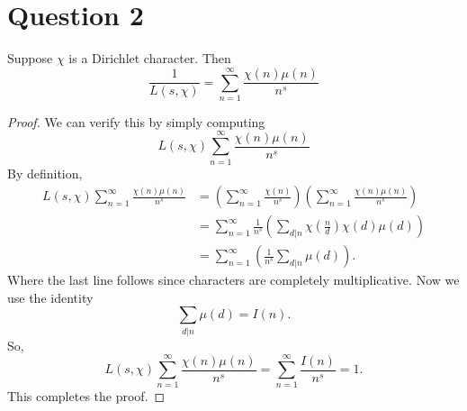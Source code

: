\documentclass{unswmaths}
\begin{document}
    \section*{Question 2}
    \begin{proposition}
        Suppose $\chi$ is a Dirichlet character. Then
        \begin{equation*}
            \frac{1}{L(s,\chi)} = \sum_{n=1}^\infty \frac{\chi(n)\mu(n)}{n^s}
        \end{equation*}
    \end{proposition}
    \begin{proof}
        We can verify this by simply computing 
        \begin{equation*}
            L(s,\chi)\sum_{n=1}^\infty \frac{\chi(n)\mu(n)}{n^s}
        \end{equation*}
        By definition,
        \begin{align*}
            L(s,\chi)\sum_{n=1}^\infty \frac{\chi(n)\mu(n)}{n^s} &= \left(\sum_{n=1}^\infty \frac{\chi(n)}{n^s}\right)\left(\sum_{n=1}^\infty \frac{\chi(n)\mu(n)}{n^s}\right)\\
            &= \sum_{n=1}^\infty \frac{1}{n^s}\left(\sum_{d|n} \chi\left(\frac{n}{d}\right)\chi(d)\mu(d)\right)\\
            &= \sum_{n=1}^\infty \left(\frac{1}{n^s}\sum_{d|n} \mu(d)\right).
        \end{align*}
        Where the last line follows since characters are completely multiplicative. Now we use the identity
        \begin{equation*}
            \sum_{d|n}\mu(d) = I(n).
        \end{equation*}
        So,
        \begin{equation*}
            L(s,\chi)\sum_{n=1}^\infty \frac{\chi(n)\mu(n)}{n^s} = \sum_{n=1}^\infty \frac{I(n)}{n^s} = 1.
        \end{equation*}
        This completes the proof.
    \end{proof}
    
\end{document}
